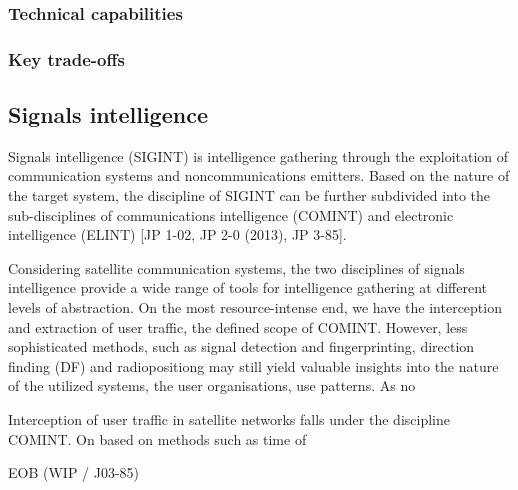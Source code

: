 \documentclass[english, 12pt, a4paper, elec, utf8, a-1b, online]{aaltothesis}
\begin{document}
\subsubsection{Technical capabilities}
\subsubsection{Key trade-offs}

\subsection{Signals intelligence}
Signals intelligence (SIGINT) is intelligence gathering through the exploitation of communication systems and noncommunications emitters.
Based on the nature of the target system, the discipline of SIGINT can be further subdivided into the sub-disciplines of communications intelligence (COMINT) and electronic intelligence (ELINT) \cite{national2015bulk} [JP 1-02, JP 2-0 (2013), JP 3-85].

Considering satellite communication systems, the two disciplines of signals intelligence provide a wide range of tools for intelligence gathering at different levels of abstraction.
On the most resource-intense end, we have the interception and extraction of user traffic, the defined scope of COMINT.
However, less sophisticated methods, such as signal detection and fingerprinting, direction finding (DF) and radiopositiong may still yield valuable insights into the nature of the utilized systems, the user organisations, use patterns.
As no 

Interception of user traffic in satellite networks falls under the discipline COMINT. On  based on methods such as time of 

EOB (WIP / J03-85)
\end{document}
